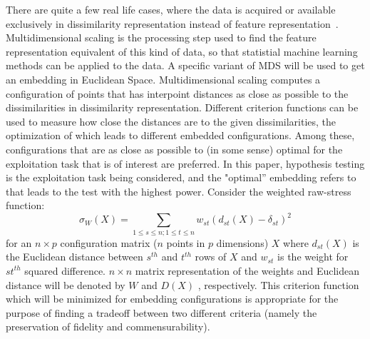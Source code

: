 \documentclass[11pt]{article} %
\begin{document}
There are quite  a few real life cases, where the data is acquired or available exclusively in dissimilarity representation instead of feature representation~\cite{CMDS,borg+groenen:1997,duin2005dissimilarity}.
 Multidimensional scaling is the processing step used to find the feature representation equivalent of this kind of data, so that  statistial machine learning methods can be applied to the data. A specific variant of MDS will be used to get an embedding in  Euclidean Space. 
Multidimensional scaling computes a configuration of points that has interpoint distances as close as possible to the dissimilarities in dissimilarity representation. Different criterion functions can be used to measure how close the distances are  to the given dissimilarities, the optimization of which leads to different embedded configurations. Among these, configurations  that are  as close as possible to (in some sense) optimal for the exploitation task that is of interest are preferred. In this paper, hypothesis testing is the exploitation task being considered, and   the "optimal'' embedding  refers to  that leads to the  test with  the highest power. Consider the weighted raw-stress function:
\begin{equation}
\sigma_{W}(X)=\sum_{1\leq s\leq n;1\leq t\leq n} {w_{st}(d_{st}(X)-\delta_{st})^2  }\label{raw-stress}
\end{equation}
 for an  $n \times p$ configuration matrix ($n$ points in $p$ dimensions)  $X$  where $d_{st}(X)$ is the Euclidean distance between $s^{th}$ and $t^{th}$ rows of $X$ and $w_{st}$ is the weight for $st^{th}$  squared difference.  $n \times n$  matrix representation of the weights and Euclidean distance will be denoted by $W$ and $D(X)$  , respectively. This   criterion function which will be minimized for embedding configurations is appropriate for the purpose of finding a tradeoff between two different criteria (namely the preservation of fidelity and commensurability).
\end{document}
